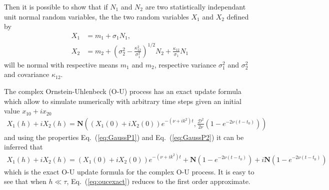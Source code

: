 \documentclass[10pt,a4paper]{article}
\newcommand{\eq}[1]{Eq.~(\ref{#1})}
\newcommand{\gaussian}{\ensuremath{\mathbf{N}}}
\newcommand{\src}{\ensuremath{\mathcal{D}}}
\newcommand{\OU}{\renewcommand{\OU}{O-U\xspace}Ornstein-Uhlenbeck (O-U)\xspace}
\newcommand{\comment}[1]{}
\begin{document}
Then it is possible to show that if $N_1$ and $N_2$
are two statistically independant unit normal random variables, the the two
random variables $X_1$ and $X_2$ defined by \citep{gillespie:1996c}
\begin{align}
X_1 &= m_1+\sigma_1N_1,\\
X_2 &= m_2+\left(\sigma_2^2{-}\frac{\kappa_{12}^2}{\sigma_1^2}\right)^{1/2}N_2
+ \frac{\kappa_{12}}{\sigma_1}N_1
\end{align}
will be normal with respective means $m_1$ and $m_2$, respective variance
$\sigma_1^2$ and $\sigma_2^2$ and covariance $\kappa_{12}$. 
\comment{
It is also equivalent to
\begin{align}
X_1 &= m_1+\left(\sigma_1^2{-}\frac{\kappa_{12}^2}{\sigma_2^2}\right)^{1/2}N_1
+\frac{\kappa_{12}}{2\sigma_1}N_2 ,\\
X_2 &=
m_2+\left(\sigma_2^2{-}\frac{\kappa_{12}^2}{\sigma_1^2}\right)^{1/2}N_2
+ \frac{\kappa_{12}}{\sigma_1}N_1
\end{align}
}

The complex \OU process has an exact update formula which allow to simulate
numerically with arbitrary time steps given an initial value $x_{10}+ix_{20}$
\begin{align}
X_1(h)+iX_2(h) = \gaussian\left(\left(X_1(0)+iX_2(0)\right)e^{-(\nu+ik^2)t},
\frac{\src^2}{2\nu}\left(1-e^{-2\nu(t-t_0)}\right)\right)
\end{align}
and using the properties \eq{eq:GaussP1} and \eq{eq:GaussP2} it can be
inferred that
\begin{align}
X_1(h)+iX_2(h) = \left(X_1(0)+iX_2(0)\right)e^{-(\nu+ik^2)t}+
\gaussian\left(1-e^{-2\nu(t-t_0)}\right)+
i\gaussian\left(1-e^{-2\nu(t-t_0)}\right)
\label{eq:oucexact}
\end{align}
which is the exact \OU update formula for the complex \OU process. It is easy
to see that when $h\ll\tau$, \eq{eq:oucexact} reduces to the first order
approximate.
\end{document}
